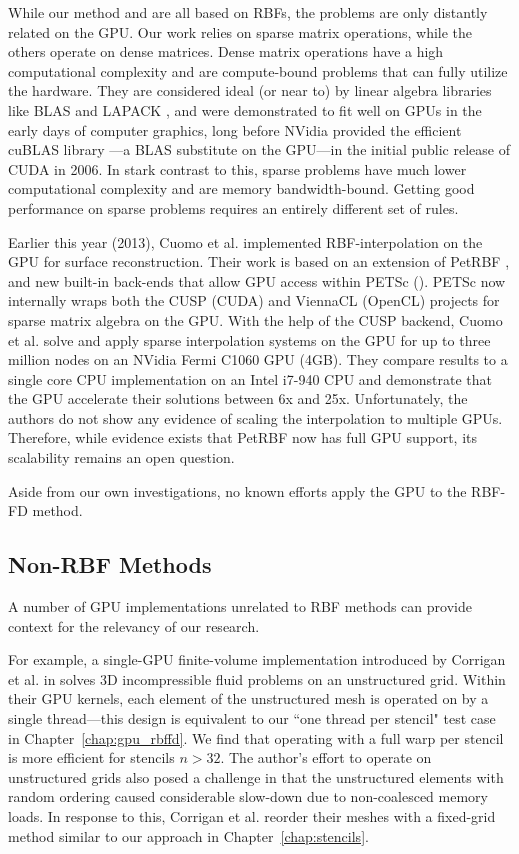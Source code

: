 \documentclass[11pt]{report}
\begin{document}
While our method and \cite{Schmidt2009a,Schmidt2009b,Gumerov2007a, Gumerov2007b} are all based on RBFs, the problems are only distantly related on the GPU. Our work relies on sparse matrix operations, while the others operate on dense matrices. Dense matrix operations have a high computational complexity and are compute-bound problems that can fully utilize the hardware. They are considered ideal (or near to) by linear algebra libraries like BLAS \cite{BLAS} and LAPACK \cite{Lapack1999}, and were demonstrated to fit well on GPUs in the early days of computer graphics, long before NVidia provided the efficient cuBLAS library \cite{CudaToolkitDoc}---a BLAS substitute on the GPU---in the initial public release of CUDA in 2006. In stark contrast to this, sparse problems have much lower computational complexity and are memory bandwidth-bound. Getting good performance on sparse problems requires an entirely different set of rules. 

Earlier this year (2013), Cuomo et al. \cite{Cuomo2013} implemented RBF-interpolation on the GPU for surface reconstruction. Their work is based on an extension of PetRBF \cite{Yokota2010}, and new built-in back-ends that allow GPU access within PETSc (\cite{Minden2010}). PETSc now internally wraps both the CUSP \cite{Cusp2012} (CUDA) and ViennaCL \cite{Rupp2010,Rupp2010a} (OpenCL) projects for sparse matrix algebra on the GPU. With the help of the CUSP backend, Cuomo et al. solve and apply sparse interpolation systems on the GPU for up to three million nodes on an NVidia Fermi C1060 GPU (4GB). They compare results to a single core CPU implementation on an Intel i7-940 CPU and demonstrate that the GPU accelerate their solutions between 6x and 25x. Unfortunately, the authors do not show any evidence of scaling the interpolation to multiple GPUs. Therefore, while evidence exists that PetRBF now has full GPU support, its scalability remains an open question. 


Aside from our own investigations, no known efforts apply the GPU to the RBF-FD method. 


\subsection{Non-RBF Methods} 

A number of GPU implementations unrelated to RBF methods can provide context for the relevancy of our research.

For example, a single-GPU finite-volume implementation introduced by Corrigan et al. in \cite{Corrigan2009} solves 3D incompressible fluid problems on an unstructured grid. Within their GPU kernels, each element of the unstructured mesh is operated on by a single thread---this design is equivalent to our ``one thread per stencil" test case in Chapter~\ref{chap:gpu_rbffd}. We find that operating with a full warp per stencil is more efficient for stencils $n > 32$. The author's effort to operate on unstructured grids also posed a challenge in that the unstructured elements with random ordering caused considerable slow-down due to non-coalesced memory loads. In response to this, Corrigan et al. reorder their meshes with a fixed-grid method similar to our approach in Chapter~\ref{chap:stencils}. 
\end{document}
